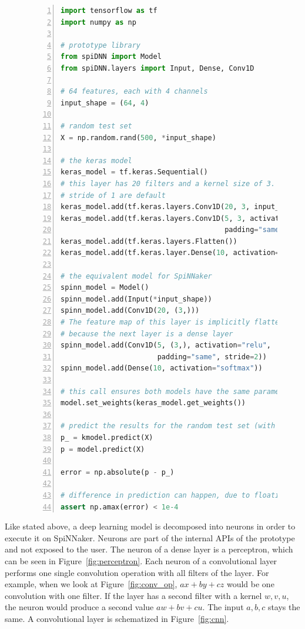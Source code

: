 \documentclass[]{article}
\begin{document}
\begin{figure} %
\begin{lstlisting}[language=Python, caption={Example code comparing
  inference with 1D CNNs in Keras to inference with the prototype.},
  captionpos=b, label=lst:spiDNN_vs_keras_cnns, numbers=left]
import tensorflow as tf
import numpy as np

# prototype library
from spiDNN import Model
from spiDNN.layers import Input, Dense, Conv1D

# 64 features, each with 4 channels
input_shape = (64, 4)

# random test set
X = np.random.rand(500, *input_shape)

# the keras model
keras_model = tf.keras.Sequential()
# this layer has 20 filters and a kernel size of 3. Valid padding and a
# stride of 1 are default
keras_model.add(tf.keras.layers.Conv1D(20, 3, input_shape=input_shape))
keras_model.add(tf.keras.layers.Conv1D(5, 3, activation="relu",
                                       padding="same", strides=2))
keras_model.add(tf.keras.layers.Flatten())
keras_model.add(tf.keras.layer.Dense(10, activation="softmax"))

# the equivalent model for SpiNNaker
spinn_model = Model()
spinn_model.add(Input(*input_shape))
spinn_model.add(Conv1D(20, (3,)))
# The feature map of this layer is implicitly flattened,
# because the next layer is a dense layer
spinn_model.add(Conv1D(5, (3,), activation="relu",
                       padding="same", stride=2))
spinn_model.add(Dense(10, activation="softmax"))

# this call ensures both models have the same parameters
model.set_weights(keras_model.get_weights())

# predict the results for the random test set (with random weights)
p_ = kmodel.predict(X)
p = model.predict(X)

error = np.absolute(p - p_)

# difference in prediction can happen, due to floating point errors
assert np.amax(error) < 1e-4
\end{lstlisting}
\end{figure} %

Like stated above, a deep learning model is decomposed into neurons
in order to execute it on SpiNNaker.
Neurons are part of the internal APIs of the prototype and not exposed
to the user.
The neuron of a dense layer is a perceptron, which can be seen in
Figure~\ref{fig:perceptron}.
Each neuron of a convolutional layer performs one single convolution
operation with all filters of the layer.
For example, when we look at Figure~\ref{fig:conv_op}, $ax + by + cz$
would be one convolution with one filter.
If the layer has a second filter with a kernel $w, v, u$, the neuron
would produce a second value $aw + bv + cu$.
The input $a, b, c$ stays the same.
A convolutional layer is schematized in Figure~\ref{fig:cnn}.
\end{document}
